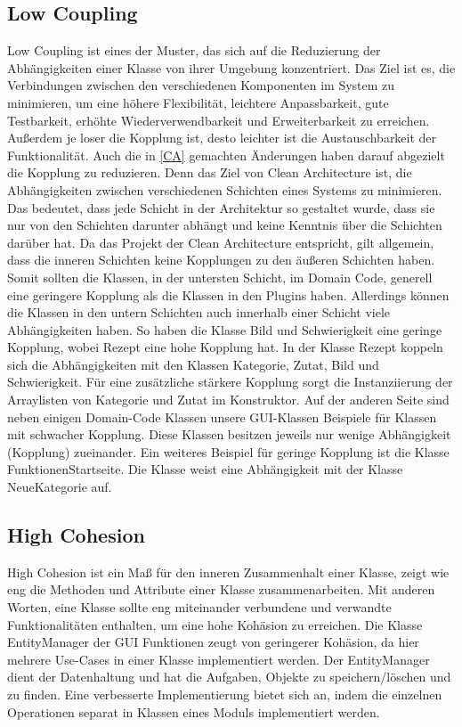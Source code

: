 \subsection{Low Coupling}
Low Coupling ist eines der Muster, das sich auf die Reduzierung der Abhängigkeiten einer Klasse von ihrer Umgebung konzentriert. Das Ziel ist es, die Verbindungen zwischen den verschiedenen Komponenten im System zu minimieren, um eine höhere Flexibilität, leichtere Anpassbarkeit, gute Testbarkeit, erhöhte Wiederverwendbarkeit und Erweiterbarkeit zu erreichen. Außerdem je loser die Kopplung ist, desto leichter ist die Austauschbarkeit der Funktionalität.
Auch die in \autoref{CA} gemachten Änderungen haben darauf abgezielt die Kopplung zu reduzieren. Denn das Ziel von Clean Architecture ist, die Abhängigkeiten zwischen verschiedenen Schichten eines Systems zu minimieren. Das bedeutet, dass jede Schicht in der Architektur so gestaltet wurde, dass sie nur von den Schichten darunter abhängt und keine Kenntnis über die Schichten darüber hat. Da das Projekt der Clean Architecture entspricht, gilt allgemein, dass die inneren Schichten keine Kopplungen zu den äußeren Schichten haben. 
Somit sollten die Klassen, in der untersten Schicht, im Domain Code, generell eine geringere Kopplung als die Klassen in den Plugins haben. Allerdings können die Klassen in den untern Schichten auch innerhalb einer Schicht viele Abhängigkeiten haben. So haben die Klasse Bild und Schwierigkeit eine geringe Kopplung, wobei Rezept eine hohe Kopplung hat.  
In der Klasse Rezept koppeln sich die Abhängigkeiten mit den Klassen Kategorie, Zutat, Bild und Schwierigkeit. Für eine zusätzliche stärkere Kopplung sorgt die Instanziierung der Arraylisten von Kategorie und Zutat im Konstruktor.
Auf der anderen Seite sind neben einigen Domain-Code Klassen unsere GUI-Klassen Beispiele für Klassen mit schwacher Kopplung. Diese Klassen besitzen jeweils nur wenige Abhängigkeit (Kopplung) zueinander. 
Ein weiteres Beispiel für geringe Kopplung ist die Klasse FunktionenStartseite. Die Klasse weist eine Abhängigkeit mit der Klasse NeueKategorie auf.

\subsection{High Cohesion}
High Cohesion  ist ein Maß für den inneren Zusammenhalt einer Klasse, zeigt wie eng die Methoden und Attribute einer Klasse zusammenarbeiten. Mit anderen Worten, eine Klasse sollte eng miteinander verbundene und verwandte Funktionalitäten enthalten, um eine hohe Kohäsion zu erreichen. 
Die Klasse EntityManager der GUI Funktionen zeugt von geringerer Kohäsion, da hier mehrere Use-Cases in einer Klasse implementiert werden. Der EntityManager dient der Datenhaltung und hat die Aufgaben, Objekte zu speichern/löschen und zu finden. Eine verbesserte Implementierung bietet sich an, indem die einzelnen Operationen separat in Klassen eines Moduls implementiert werden.

